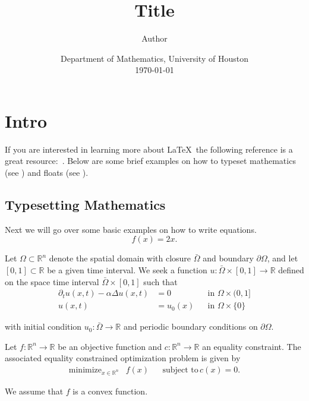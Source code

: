 \documentclass[11pt]{article}
\title{Title}
\author{Author}
\date{Department of Mathematics, University of Houston\\\today}
\begin{document}
\maketitle

\section{Intro}
\label{s:intro}

If you are interested in learning more about \LaTeX\ the following reference is a great resource:~\cite{Oetiker:2018a}. Below are some brief examples on how to typeset mathematics (see ) and floats (see ).




\subsection{Typesetting Mathematics}
\label{s:type-math}

Next we will go over some basic examples on how to write equations.
\begin{equation}
f(x) = 2x.
\end{equation}

Let $\Omega\subset\mathbb{R}^n$ denote the spatial domain with closure $\bar{\Omega}$ and boundary $\partial\Omega$, and let $[0,1]\subset\mathbb{R}$ be a given time interval. We seek a function $u : \bar{\Omega} \times [0,1]\to \mathbb{R}$ defined on the space time interval $\bar{\Omega} \times [0,1]$ such that
\begin{align}
\partial_t u(x,t) - \alpha\Delta u(x,t) & = 0      && \text{in }\Omega\times(0,1] \\
                                 u(x,t) & = u_0(x) && \text{in }\Omega\times\{0\}
\end{align}

\noindent with initial condition $u_0: \bar{\Omega}\to\mathbb{R}$ and periodic boundary conditions on $\partial\Omega$.


Let $f : \mathbb{R}^n \to \mathbb{R}$ be an objective function and $c : \mathbb{R}^n \to \mathbb{R}$ an equality constraint. The associated equality constrained optimization problem is given by
\begin{align}
\operatorname{minimize}_{x\in\mathbb{R}^n} & f(x) && \text{subject to}\, c(x) = 0.
\end{align}

We assume that $f$ is a convex function.
\end{document}
